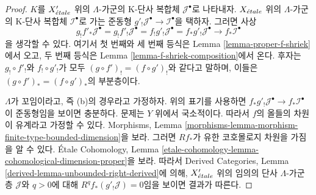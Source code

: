 \begin{proof}
$K$를 $X'_{\acute{e}tale}$ 위의 $\Lambda$-가군의 K-단사 복합체
$\mathcal{J}^\bullet$로 나타내자. $X_{\acute{e}tale}$ 위의 $\Lambda$-가군의
K-단사 복합체 $\mathcal{I}^\bullet$로 가는 준동형
$g'_!\mathcal{J}^\bullet \to \mathcal{I}^\bullet$을 택하자. 그러면 사상
$$
g_!f'_*\mathcal{J}^\bullet =
g_!f'_!\mathcal{J}^\bullet =
f_!g'_!\mathcal{J}^\bullet =
f_*g'_!\mathcal{J}^\bullet \to
f_*\mathcal{I}^\bullet
$$
을 생각할 수 있다. 여기서 첫 번째와 세 번째 등식은 Lemma
\ref{lemma-proper-f-shriek}에서 오고, 두 번째 등식은 Lemma
\ref{lemma-f-shriek-composition}에서 온다. 후자는
$g_! \circ f'_!$와 $f_! \circ g'_!$가 모두
$(g \circ f')_! = (f \circ g')_!$와 같다고 말하며, 이들은
$(g \circ f')_* = (f \circ g')_*$의 부분층이다.

\medskip\noindent
$\Lambda$가 꼬임이라고, 즉 (b)의 경우라고 가정하자. 위의 표기를
사용하면 $f_*g'_!\mathcal{J}^\bullet \to f_*\mathcal{I}^\bullet$이
준동형임을 보이면 충분하다. 문제는 $Y$ 위에서 국소적이다. 따라서
$f$의 올들의 차원이 유계라고 가정할 수 있다. Morphisms, Lemma
\ref{morphisms-lemma-morphism-finite-type-bounded-dimension}을 보라.
그러면 $Rf_*$가 유한 코호몰로지 차원을 가짐을 알 수 있다.
\'Etale Cohomology, Lemma
\ref{etale-cohomology-lemma-cohomological-dimension-proper}을 보라.
따라서 Derived Categories, Lemma
\ref{derived-lemma-unbounded-right-derived}에 의해, $X'_{\acute{e}tale}$ 위의
임의의 단사 $\Lambda$-가군 층 $\mathcal{J}$와 $q > 0$에 대해
$R^qf_*(g'_!\mathcal{J}) = 0$임을 보이면 결과가 따른다.


\end{proof}

